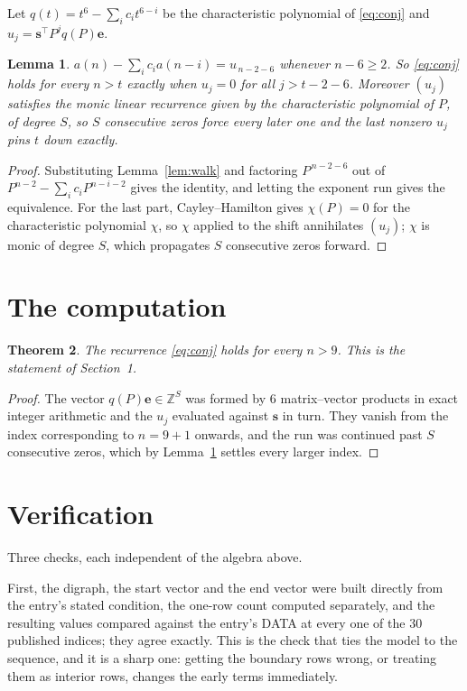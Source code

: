 \documentclass[11pt,a4paper]{article}
\theoremstyle{plain}
\newtheorem{theorem}{Theorem}
\newtheorem{lemma}[theorem]{Lemma}
\theoremstyle{definition}
\begin{document}
Let $q(t)=t^{6}-\sum_i c_i t^{6-i}$ be the characteristic polynomial of
\eqref{eq:conj} and $u_j=\mathbf{s}^{\!\top}P^{j}q(P)\mathbf{e}$.

\begin{lemma}\label{lem:crit}
$a(n)-\sum_i c_i a(n-i)=u_{\,n-2-6}$ whenever $n-6\ge2$. So \eqref{eq:conj}
holds for every $n>t$ exactly when $u_j=0$ for all $j>t-2-6$. Moreover $(u_j)$
satisfies the monic linear recurrence given by the characteristic polynomial of $P$, of
degree $S$, so $S$ consecutive zeros force every later one and the last nonzero $u_j$ pins
$t$ down exactly.
\end{lemma}

\begin{proof}
Substituting Lemma~\ref{lem:walk} and factoring $P^{\,n-2-6}$ out of
$P^{n-2}-\sum_i c_i P^{n-i-2}$ gives the identity, and letting the exponent run gives the
equivalence. For the last part, Cayley--Hamilton gives $\chi(P)=0$ for the characteristic
polynomial $\chi$, so $\chi$ applied to the shift annihilates $(u_j)$; $\chi$ is monic of
degree $S$, which propagates $S$ consecutive zeros forward.
\end{proof}

\section{The computation}

\begin{theorem}
The recurrence \eqref{eq:conj} holds for every $n>9$. This is the statement of
Section~1.
\end{theorem}

\begin{proof}
The vector $q(P)\mathbf{e}\in\mathbb{Z}^{S}$ was formed by $6$ matrix--vector
products in exact integer arithmetic and the $u_j$ evaluated against $\mathbf{s}$ in turn.
They vanish from the index corresponding to $n=9+1$ onwards, and the run was continued
past $S$ consecutive zeros, which by Lemma~\ref{lem:crit} settles every larger index.
\end{proof}

\section{Verification}

Three checks, each independent of the algebra above.

First, the digraph, the start vector and the end vector were built directly from the
entry's stated condition, the one-row count computed separately, and the resulting values
compared against the entry's DATA at every one of the $30$ published indices; they
agree exactly. This is the check that ties the model to the sequence, and it is a sharp one:
getting the boundary rows wrong, or treating them as interior rows, changes the early terms
immediately.
\end{document}
